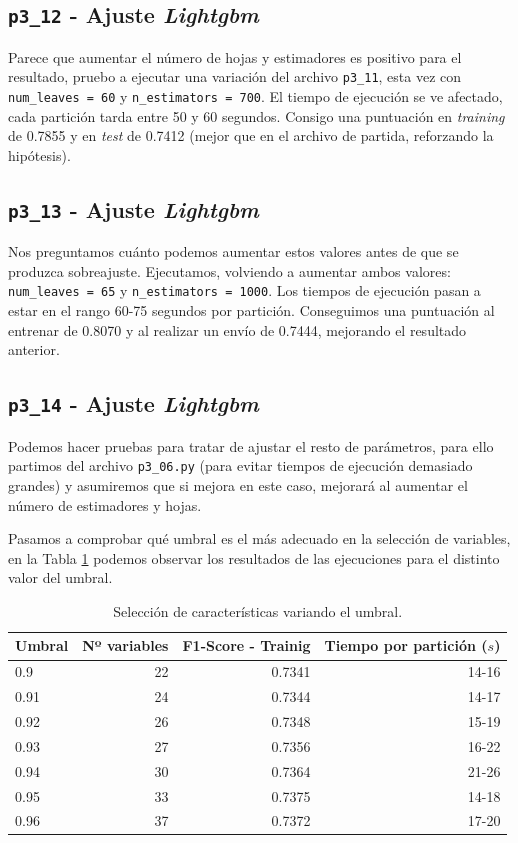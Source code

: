 \documentclass[a4paper, 20pt]{article}
\begin{document}
\subsection{\texttt{p3\_12} - Ajuste \textit{Lightgbm}}

Parece que aumentar el número de hojas y estimadores es positivo para el resultado, pruebo a ejecutar una variación del archivo \texttt{p3\_11}, esta vez con \texttt{num\_leaves = 60} y \texttt{n\_estimators = 700}. El tiempo de ejecución se ve afectado, cada partición tarda entre 50 y 60 segundos. Consigo una puntuación en \textit{training} de 0.7855 y en \textit{test} de 0.7412 (mejor que en el archivo de partida, reforzando la hipótesis).

\subsection{\texttt{p3\_13} - Ajuste \textit{Lightgbm}}

Nos preguntamos cuánto podemos aumentar estos valores antes de que se produzca sobreajuste. Ejecutamos, volviendo a aumentar ambos valores:  \texttt{num\_leaves = 65} y \texttt{n\_estimators = 1000}. Los tiempos de ejecución pasan a estar en el rango 60-75 segundos por partición. Conseguimos una puntuación al entrenar de 0.8070 y al realizar un envío de 0.7444, mejorando el resultado anterior.

\subsection{\texttt{p3\_14} - Ajuste \textit{Lightgbm}}

Podemos hacer pruebas para tratar de ajustar el resto de parámetros, para ello partimos del archivo \texttt{p3\_06.py} (para evitar tiempos de ejecución demasiado grandes) y asumiremos que si mejora en este caso, mejorará al aumentar el número de estimadores y hojas.

Pasamos a comprobar qué umbral es el más adecuado en la selección de variables, en la Tabla \ref{tab:14} podemos observar los resultados de las ejecuciones para el distinto valor del umbral.

\begin{table}[H]
\centering
\caption{Selección de características variando el umbral.}
\label{tab:14}
\begin{tabular}{lrrr}
\toprule
Umbral & Nº variables & F1-Score - Trainig & Tiempo por partición ($s$)\\
\midrule
0.9 & 22 & 0.7341 & 14-16\\
0.91 & 24 & 0.7344 & 14-17 \\
0.92 & 26 & 0.7348 & 15-19 \\
0.93 & 27 & 0.7356 & 16-22 \\  
0.94 & 30 & 0.7364 & 21-26 \\
0.95 & 33 & 0.7375 & 14-18\\
0.96 & 37 & 0.7372 & 17-20\\ 
\bottomrule
\end{tabular}
\end{table}
\end{document}
